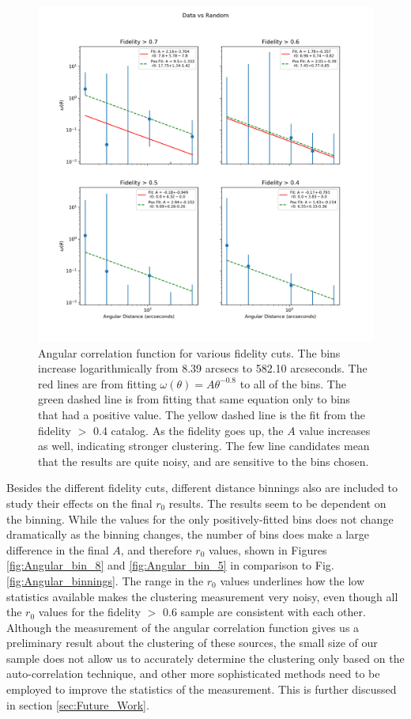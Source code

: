 \begin{figure}[!htbp]
\centering \includegraphics[width=160mm]{FINAL_Log_4Panel_Data_Vs_Random_bin6_NFalse_Num20000.png}
\caption{Angular correlation function for various fidelity cuts. The bins increase logarithmically from 8.39 arcsecs to 582.10 arcseconds. The red lines are from fitting $\omega(\theta) = A\theta^{-0.8} $ to all of the bins. The green dashed line is from fitting that same equation only to bins that had a positive value. The yellow dashed line is the fit from the fidelity $>$ 0.4 catalog. As the fidelity goes up, the $A$ value increases as well, indicating stronger clustering. The few line candidates mean that the results are quite noisy, and are sensitive to the bins chosen.}
\label{fig:Angular_correlation}
\end{figure}

Besides the different fidelity cuts, different distance binnings also are included to study their effects on the final $r_0$ results. The results seem to be dependent on the binning. While the values for the only positively-fitted bins does not change dramatically as the binning changes, the number of bins does make a large difference in the final $A$, and therefore $r_0$ values, shown in Figures \ref{fig:Angular_bin_8} and \ref{fig:Angular_bin_5} in comparison to Fig. \ref{fig:Angular_binnings}. The range in the $r_0$ values underlines how the low statistics available makes the clustering measurement very noisy, even though all the $r_0$ values for the fidelity $>$ 0.6 sample are consistent with each other. Although the measurement of the angular correlation function gives us a preliminary result about the clustering of these sources, the small size of our sample does not allow us to accurately determine the clustering only based on the auto-correlation technique, and other more sophisticated methods need to be employed to improve the statistics of the measurement. This is further discussed in section \ref{sec:Future_Work}.


